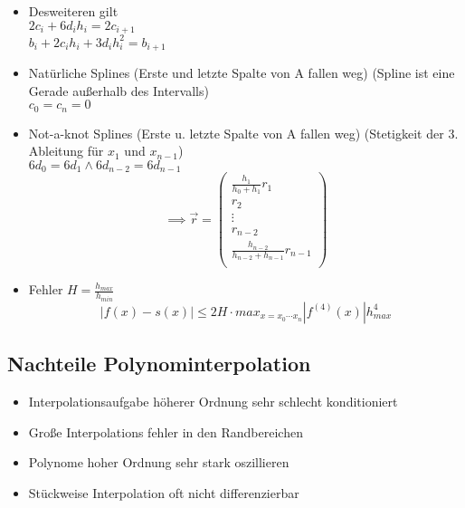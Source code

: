 \begin{itemize}
	\item Desweiteren gilt \\
		$2 c_i + 6 d_i h_i = 2 c_{i+1}$ \\
		$b_i + 2 c_i h_i + 3 d_i h_i^2 = b_{i+1}$
	
	\item Natürliche Splines (Erste und letzte Spalte von A fallen weg)
	(Spline ist eine Gerade außerhalb des Intervalls) \\
	$c_0 = c_n = 0$
	
	\item Not-a-knot Splines (Erste u. letzte Spalte von A fallen weg)
	(Stetigkeit der 3. Ableitung für $x_1$ und $x_{n-1}$) \\
	$6d_0 = 6d_1 \wedge 6d_{n-2} = 6d_{n-1}$ 
	\begin{displaymath}
		\implies \vec{r} =
		\begin{pmatrix}
			\frac{h_1}{h_0 + h_1} r_1 \\
			r_2 \\
			\vdots \\
			r_{n-2} \\
			\frac{h_{n-2}}{h_{n-2}+h_{n-1}} r_{n-1} \\
		\end{pmatrix}
	\end{displaymath}
	
	\item Fehler $H = \frac{h_{max}}{h_{min}}$ \\
	\begin{equation*}
		|f(x)-s(x)| \leq 2H \cdot max_{x=x_0 \cdots x_n}|f^{(4)}(x)|h_{max}^4
	\end{equation*}
	
\end{itemize}

\subsection{Nachteile Polynominterpolation}
\begin{itemize}

	\item Interpolationsaufgabe höherer Ordnung sehr schlecht konditioniert

	\item Große Interpolations fehler in den Randbereichen
	
	\item Polynome hoher Ordnung sehr stark oszillieren
	
	\item Stückweise Interpolation oft nicht differenzierbar

\end{itemize}
